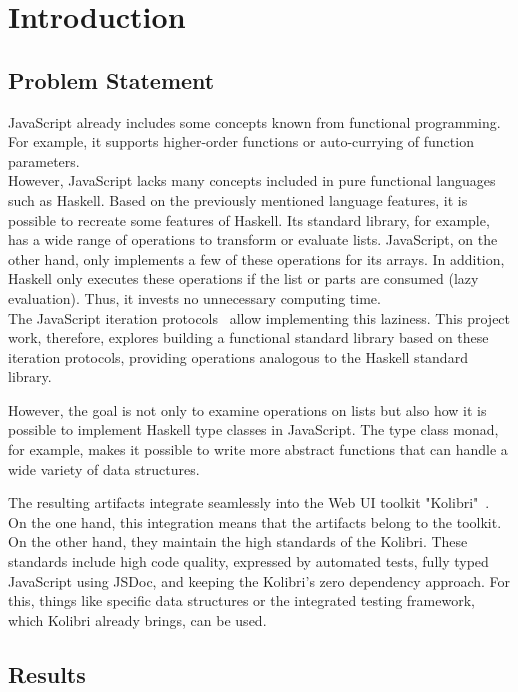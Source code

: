 \chapter{Introduction}
\label{chap:introduction}

\section*{Problem Statement} %
\label{sec:Problem Statement}
JavaScript already includes some concepts known from functional programming.
For example, it supports higher-order functions or auto-currying of function
parameters.\\
However, JavaScript lacks many concepts included in pure functional languages
such as Haskell. Based on the previously mentioned language features, it is
possible to recreate some features of Haskell. Its standard library, for
example, has a wide range of operations to transform or evaluate lists.
JavaScript, on the other hand, only implements a few of these operations for
its arrays. In addition, Haskell only executes these operations if the list or
parts are consumed (lazy evaluation). Thus, it invests no unnecessary computing
time.\\
The JavaScript iteration protocols~\cite{mdn_protocols} allow implementing this laziness. This
project work, therefore, explores building a functional standard library based
on these iteration protocols, providing operations analogous to the Haskell
standard library.

However, the goal is not only to examine operations on lists but also how it is
possible to implement Haskell type classes in JavaScript. The type class monad,
for example, makes it possible to write more abstract functions that can handle
a wide variety of data structures. 

The resulting artifacts integrate seamlessly into the Web UI toolkit
"Kolibri"~\cite{kolibri}. On the one hand, this integration means that the
artifacts belong to the toolkit. On the other hand, they maintain the high
standards of the Kolibri. These standards include high code quality, expressed
by automated tests, fully typed JavaScript using JSDoc, and keeping the
Kolibri's zero dependency approach. For this, things like specific data
structures or the integrated testing framework, which Kolibri already brings,
can be used.

\section*{Results} %
\label{sec:Introduction_Results}

